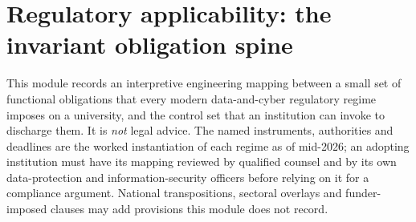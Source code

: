 %
%
%
%

\section{Regulatory applicability: the invariant obligation spine}
\label{sec:reg-applicability}

\begin{caveatbox}
\noindent This module records an interpretive engineering mapping
between a small set of functional obligations that every modern
data-and-cyber regulatory regime imposes on a university, and the
 control set that an institution can invoke to
discharge them. It is \emph{not} legal advice. The named instruments,
authorities and deadlines are the worked instantiation of each regime
as of mid-2026; an adopting institution must have its mapping reviewed
by qualified counsel and by its own data-protection and
information-security officers before relying on it for a compliance
argument. National transpositions, sectoral overlays and
funder-imposed clauses may add provisions this module does not record.
\end{caveatbox}

